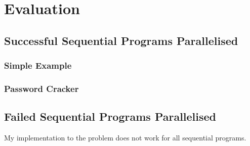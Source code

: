 \chapter{Evaluation}

\section{Successful Sequential Programs Parallelised}
\subsection{Simple Example}

\subsection{Password Cracker}

\section{Failed Sequential Programs Parallelised}
My implementation to the problem does not work for all sequential programs.
